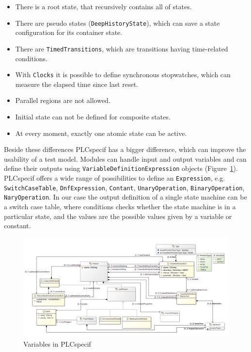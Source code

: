 \begin{itemize}
	\item There is a root state, that recursively contains all of states.
	\item There are pseudo states (\texttt{DeepHistoryState}), which can save a state configuration for its container state.
	\item There are \texttt{TimedTransitions}, which are transitions having time-related conditions.
	\item With \texttt{Clocks} it is possible to define synchronous stopwatches, which can measure the elapsed time since last reset.
	\item Parallel regions are not allowed.
	\item Initial state can not be defined for composite states.
	\item At every moment, exactly one atomic state can be active. 
\end{itemize}

Beside these differences PLCspecif has a bigger difference, which can improve the usability of a test model. Modules can handle input and output variables and can define their outputs using \texttt{VariableDefinitionExpression} objects (Figure~\ref{fig:plchsm_variables}). PLCspecif offers a wide range of possibilities to define an \texttt{Expression}, e.g. \texttt{SwitchCaseTable}, \texttt{DnfExpression}, \texttt{Contant}, \texttt{UnaryOperation}, \texttt{BinaryOperation}, \texttt{NaryOperation}. In our case the output definition of a single state machine can be a switch case table, where conditions checks whether the state machine is in a particular state, and the values are the possible values given by a variable or constant.

\begin{figure}[htp]
\centering
\includegraphics[scale=0.6]{figures/plchsm_variables}
\caption{Variables in PLCspecif \cite{plcspecif}}
\label{fig:plchsm_variables}
\end{figure}

